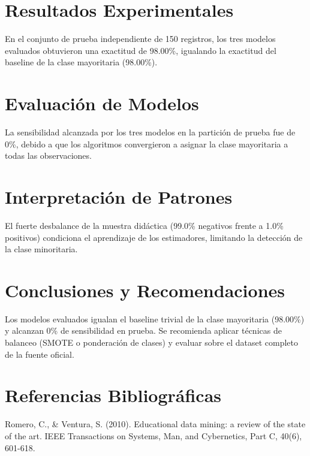 \documentclass[11pt,a4paper]{article}
\begin{document}
\section{Resultados Experimentales}
En el conjunto de prueba independiente de 150 registros, los tres modelos evaluados obtuvieron una exactitud de 98.00\%, igualando la exactitud del baseline de la clase mayoritaria (98.00\%).
\section{Evaluación de Modelos}
La sensibilidad alcanzada por los tres modelos en la partición de prueba fue de 0\%, debido a que los algoritmos convergieron a asignar la clase mayoritaria a todas las observaciones.
\section{Interpretación de Patrones}
El fuerte desbalance de la muestra didáctica (99.0\% negativos frente a 1.0\% positivos) condiciona el aprendizaje de los estimadores, limitando la detección de la clase minoritaria.
\section{Conclusiones y Recomendaciones}
Los modelos evaluados igualan el baseline trivial de la clase mayoritaria (98.00\%) y alcanzan 0\% de sensibilidad en prueba. Se recomienda aplicar técnicas de balanceo (SMOTE o ponderación de clases) y evaluar sobre el dataset completo de la fuente oficial.
\section{Referencias Bibliográficas}
Romero, C., \& Ventura, S. (2010). Educational data mining: a review of the state of the art. IEEE Transactions on Systems, Man, and Cybernetics, Part C, 40(6), 601-618.
\end{document}
